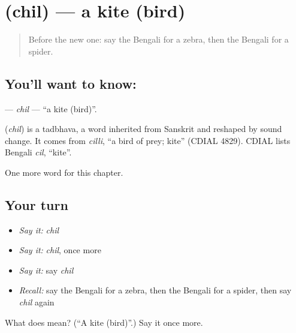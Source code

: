 \section[\texorpdfstring{\bn{চিল} (chil)}{চিল (chil)}]{ (chil) — a kite (bird)}

\label{lesson:BN-C250-chil}



\begin{quote}
Before the new one: say the Bengali for a zebra, then the Bengali for a spider.
\end{quote}

\subsection*{You'll want to know: }
\textbf{} — \emph{chil} — \textquotedblleft{}a kite (bird)\textquotedblright{}.

\begin{cousinweb}
\textbf{} (\emph{chil}) is a tadbhava, a word inherited from Sanskrit and reshaped by sound change. It comes from \emph{cilli}, \textquotedblleft{}a bird of prey; kite\textquotedblright{} (CDIAL 4829). CDIAL lists Bengali \emph{cil}, \textquotedblleft{}kite\textquotedblright{}.
\end{cousinweb}

\begin{grammarlens}[title={What you've built}]
One more word for this chapter.
\end{grammarlens}

\subsection*{Your turn}
\begin{itemize}
\raggedright
  \item \emph{Say it:} \emph{chil}
  \item \emph{Say it:} \emph{chil}, once more
  \item \emph{Say it:} say \emph{chil}
  \item \emph{Recall:} say the Bengali for a zebra, then the Bengali for a spider, then say \emph{chil} again
\end{itemize}

\begin{tcolorbox}[breakable,colback=teal!4,colframe=teal!35!black,title={Before you move on}]
What does  mean? (\textquotedblleft{}A kite (bird)\textquotedblright{}.) Say it once more.
\end{tcolorbox}
